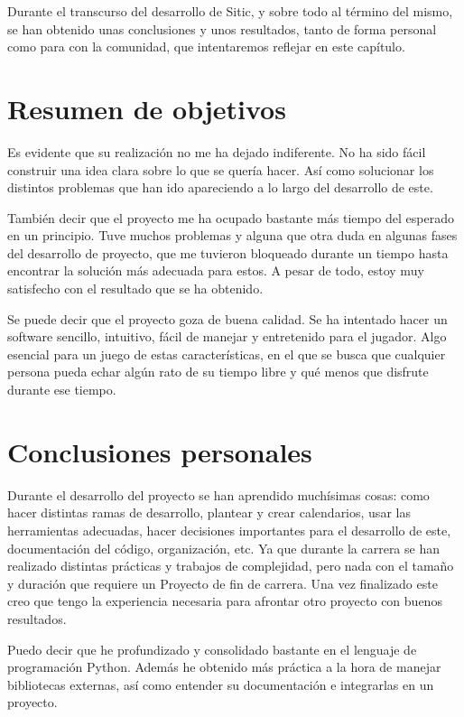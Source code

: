 
Durante el transcurso del desarrollo de Sitic, y sobre todo al término del mismo,
se han obtenido unas conclusiones y unos resultados, tanto de forma personal
como para con la comunidad, que intentaremos reflejar en este capítulo.


\section{Resumen de objetivos}

Es evidente que su realización no me ha dejado indiferente. No ha sido fácil construir una idea
clara sobre lo que se quería hacer. Así como solucionar los distintos problemas que han ido apareciendo
a lo largo del desarrollo de este.

También decir que el proyecto me ha ocupado bastante más tiempo del esperado en un principio. Tuve
muchos problemas y alguna que otra duda en algunas fases del desarrollo de proyecto, que me tuvieron
bloqueado durante un tiempo hasta encontrar la solución más adecuada para estos. A pesar de todo,
estoy muy satisfecho con el resultado que se ha obtenido.

Se puede decir que el proyecto goza de buena calidad. Se ha intentado hacer un software sencillo,
intuitivo, fácil de manejar y entretenido para el jugador. Algo esencial para un juego de estas
características, en el que se busca que cualquier persona pueda echar algún rato de su tiempo libre y qué menos
que disfrute durante ese tiempo.

\section{Conclusiones personales}

Durante el desarrollo del proyecto se han aprendido muchísimas cosas: como hacer distintas ramas de
desarrollo, plantear y crear calendarios, usar las herramientas adecuadas, hacer decisiones importantes
para el desarrollo de este, documentación del código, organización, etc. Ya que durante la carrera se
han realizado distintas prácticas y trabajos de complejidad, pero nada con el tamaño y duración que
requiere un Proyecto de fin de carrera. Una vez finalizado este creo que tengo la experiencia necesaria
para afrontar otro proyecto con buenos resultados.

Puedo decir que he profundizado y consolidado bastante en el lenguaje de programación Python.
Además he obtenido más práctica a la hora de manejar bibliotecas
externas, así como entender su documentación e integrarlas en un proyecto.

